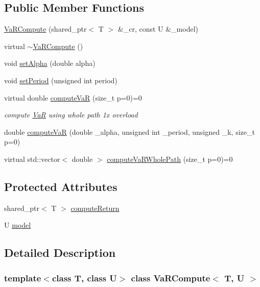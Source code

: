 \subsection*{Public Member Functions}
\begin{DoxyCompactItemize}
\item 
\hyperlink{classVaRCompute_ac4fd50c6cb5cdc8ecd9964f1c317853a}{Va\+R\+Compute} (shared\+\_\+ptr$<$ T $>$ \&\+\_\+cr, const U \&\+\_\+model)
\item 
virtual \hyperlink{classVaRCompute_a18b310b3562cadd560a70e2614a0e09c}{$\sim$\+Va\+R\+Compute} ()
\item 
void \hyperlink{classVaRCompute_a9a58944ea61c92f90befb024d12fe80c}{set\+Alpha} (double alpha)
\item 
void \hyperlink{classVaRCompute_a071d01ccfd965e5a02d2ce4f3eee5db2}{set\+Period} (unsigned int period)
\item 
virtual double \hyperlink{classVaRCompute_a0465221010d248238fe1052958776984}{compute\+VaR} (size\+\_\+t p=0)=0
\begin{DoxyCompactList}\small\item\em compute \hyperlink{classVaR}{VaR} using whole path 1x overload \end{DoxyCompactList}\item 
double \hyperlink{classVaRCompute_a26618931d3370340944295ae5d882db5}{compute\+VaR} (double \+\_\+alpha, unsigned int \+\_\+period, unsigned \+\_\+k, size\+\_\+t p=0)
\item 
virtual std\+::vector$<$ double $>$ \hyperlink{classVaRCompute_ad5ec9feb42ea2f99f2c91e793d18fe1b}{compute\+Va\+R\+Whole\+Path} (size\+\_\+t p=0)=0
\end{DoxyCompactItemize}
\subsection*{Protected Attributes}
\begin{DoxyCompactItemize}
\item 
shared\+\_\+ptr$<$ T $>$ \hyperlink{classVaRCompute_a44d8fd1ac0cd7c920e1fc255f11a92ee}{compute\+Return}
\item 
U \hyperlink{classVaRCompute_a2de1fc8b4d4df387d0495981bde72564}{model}
\end{DoxyCompactItemize}


\subsection{Detailed Description}
\subsubsection*{template$<$class T, class U$>$\newline
class Va\+R\+Compute$<$ T, U $>$}

